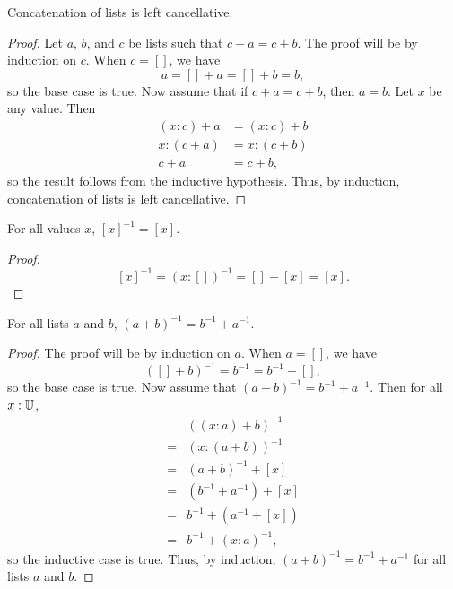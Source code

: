 \documentclass[../../math.tex]{subfiles}
\begin{document}
\begin{instance}
    Concatenation of lists is left cancellative.
\end{instance}
\begin{proof}
    Let $a$, $b$, and $c$ be lists such that $c + a = c + b$.  The proof will be
    by induction on $c$.  When $c = []$, we have
    \[
        a = [] + a = [] + b = b,
    \]
    so the base case is true.  Now assume that if $c + a = c + b$, then $a = b$.
    Let $x$ be any value.  Then
    \begin{align*}
        (x : c) + a &= (x : c) + b \\
        x : (c + a) &= x : (c + b) \\
        c + a &= c + b,
    \end{align*}
    so the result follows from the inductive hypothesis.  Thus, by induction,
    concatenation of lists is left cancellative.
\end{proof}

\begin{theorem}
    For all values $x$, $[x]^{-1} = [x]$.
\end{theorem}
\begin{proof}
    \[
        [x]^{-1} = (x : [])^{-1} = [] + [x] = [x].
    \]
\end{proof}

\begin{theorem}
    For all lists $a$ and $b$, $(a + b)^{-1} = b^{-1} + a^{-1}$.
\end{theorem}
\begin{proof}
    The proof will be by induction on $a$.  When $a = []$, we have
    \[
        ([] + b)^{-1} = b^{-1} = b^{-1} + [],
    \]
    so the base case is true.  Now assume that $(a + b)^{-1} = b^{-1} +
    a^{-1}$.  Then for all $x : \mathbb{U}$,
    \begin{align*}
           & ((x : a) + b)^{-1} \\
        ={}& (x : (a + b))^{-1} \\
        ={}& (a + b)^{-1} + [x] \\
        ={}& (b^{-1} + a^{-1}) + [x] \\
        ={}& b^{-1} + (a^{-1} + [x]) \\
        ={}& b^{-1} + (x : a)^{-1},
    \end{align*}
    so the inductive case is true.  Thus, by induction, $(a + b)^{-1} =
    b^{-1} + a^{-1}$ for all lists $a$ and $b$.
\end{proof}
\end{document}
